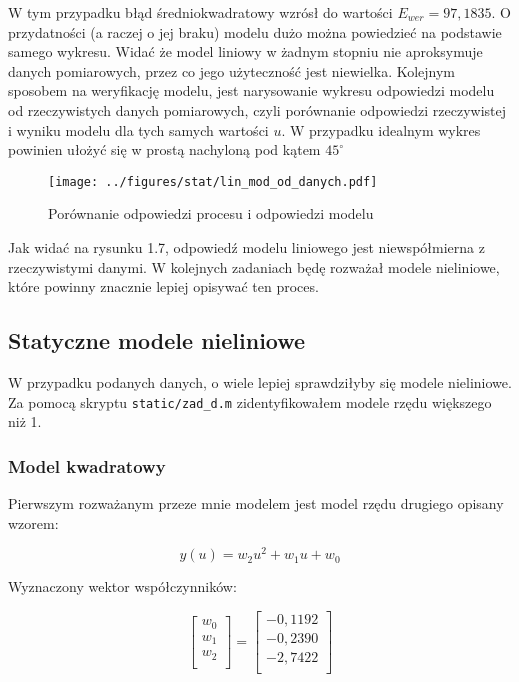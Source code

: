\documentclass[a4paper,titlepage,11pt,floatssmall]{mwrep}
\begin{document}
W tym przypadku błąd średniokwadratowy wzrósł do wartości $E_{wer} = 97,1835$. O przydatności (a raczej o jej braku) modelu dużo można powiedzieć na podstawie samego wykresu. Widać że model liniowy w żadnym stopniu nie aproksymuje danych pomiarowych, przez co jego użyteczność jest niewielka.  
\newpage 
Kolejnym sposobem na weryfikację modelu, jest narysowanie wykresu odpowiedzi modelu od rzeczywistych danych pomiarowych, czyli porównanie odpowiedzi rzeczywistej i wyniku modelu dla tych samych wartości $u$. W przypadku idealnym wykres powinien ułożyć się w prostą nachyloną pod kątem $45^{\circ}$
\begin{figure}[H]
\centering
\texttt{[image: ../figures/stat/lin\_mod\_od\_danych.pdf]}
\caption{Porównanie odpowiedzi procesu i odpowiedzi modelu}
\end{figure}
Jak widać na rysunku 1.7, odpowiedź modelu liniowego jest niewspółmierna z rzeczywistymi danymi. W kolejnych zadaniach będę rozważał modele nieliniowe, które powinny znacznie lepiej opisywać ten proces.

\subsection{Statyczne modele nieliniowe}

W przypadku podanych danych, o wiele lepiej sprawdziłyby się modele nieliniowe. Za pomocą skryptu \texttt{static/zad\_d.m} zidentyfikowałem modele rzędu większego niż 1. 

\subsubsection{Model kwadratowy}

Pierwszym rozważanym przeze mnie modelem jest model rzędu drugiego opisany wzorem: 

\begin{equation*}
y(u) = w_2u^2 + w_1u + w_0
\end{equation*}

Wyznaczony wektor współczynników:

$$
\left[\begin{array}{c}
w_0 \\
w_1 \\
w_2 \\
\end{array} \right]
= 
\left[\begin{array}{c}
-0,1192	\\
-0,2390 \\
-2,7422 \\
\end{array} \right]
$$
\end{document}
